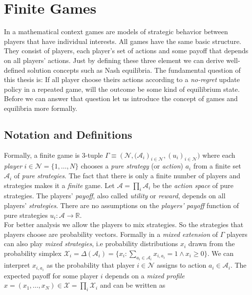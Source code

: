 
\chapter{Finite Games}\label{chapter:finiteGames}

In a mathematical context games are models of strategic behavior between players that have individual interests. All games have the same basic structure. They consist of players, each player's set of actions and some payoff that depends on all players' actions. Just by defining these three element we can derive well-defined solution concepts such as Nash equilibria. The fundamental question of this thesis is: If all player choose theirs actions according to a \textit{no-regret} update policy in a repeated game, will the outcome be some kind of equilibrium state. Before we can answer that question let us introduce the concept of games and equilibria more formally.


\section{Notation and Definitions}\label{section:notationAndDefinitionsGames}

Formally, a finite game is $3$-tuple $\Gamma \equiv (\mathcal{N}, {(\mathcal{A}_i})_{i\in\mathcal{N}},{(u_i)}_{i\in\mathcal{N}})$ where each \textit{player} $i \in \mathcal{N} = \{1,\dots,N\}$ chooses a \textit{pure strategy} (or \textit{action}) $a_i$ from a finite set $\mathcal{A}_i$ of \textit{pure strategies}. The fact that there is only a finite number of players and strategies makes it a \textit{finite} game. Let $\mathcal{A} = \prod_{i}\mathcal{A}_i$ be the \textit{action space} of pure strategies. The players' \textit{payoff}, also called \textit{utility} or \textit{reward}, depends on all players' \textit{strategies}. There are no assumptions on the \textit{players' payoff} function of pure strategies $u_i: \mathcal{A} \to \mathbb{R}$. \\

For better analysis we allow the players to mix strategies. So the strategies that players choose are probability vectors. Formally in a \textit{mixed extension} of $\Gamma$ players can also play \textit{mixed strategies}, i.e probability distributions $x_i$ drawn from the probability simplex $\mathcal{X}_i = \Delta(\mathcal{A}_i)  = \{x_i: \sum_{a_i\in \mathcal{A}_i}x_{i,a_i} = 1 \land x_i \ge 0\}$. We can interpret $x_{i,a_i}$ as the probability that player $i \in \mathcal{N}$ assigns to action $a_i \in \mathcal{A}_i$. The expected payoff for some player $i$ depends on a \textit{mixed profile} $x = (x_1,\dots,x_N) \in \mathcal{X} = \prod_{i}\mathcal{X}_i$ and can be written as

